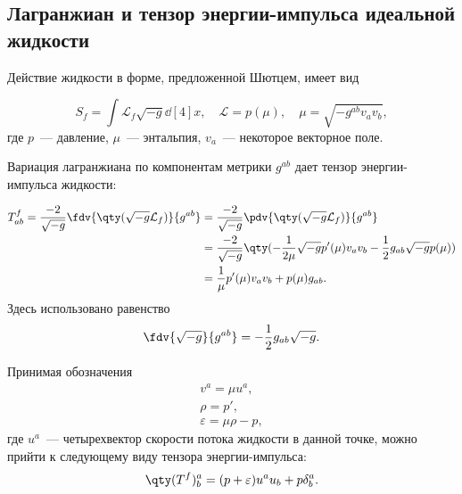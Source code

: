 \documentclass[\docroot/reports/draft/report.tex]{subfiles}
\begin{document}
\onlyinsubfile{\tableofcontents}

\subsection{Лагранжиан и тензор энергии-импульса идеальной жидкости}

    Действие жидкости в форме, предложенной Шютцем, имеет вид

    \begin{equation}
        S_f = \int \mathcal{L}_f \sqrt{-g} \dd[4]{x} , \quad
        \mathcal{L} = p(\mu) , \quad
        \mu = \sqrt{-g^{ab} v_a v_b} ,
    \end{equation}
    где $p$~--- давление, $\mu$~--- энтальпия, $v_a$~--- некоторое векторное поле.

    Вариация лагранжиана по компонентам метрики $g^{ab}$ дает тензор энергии-импульса жидкости:

    \begin{equation}\begin{aligned}
        T^f_{ab} = \frac{-2}{\sqrt{-g}} \fdv{\qty(\sqrt{-g} \mathcal{L}_f)}{g^{ab}} &=
            \frac{-2}{\sqrt{-g}} \pdv{\qty(\sqrt{-g} \mathcal{L}_f)}{g^{ab}} \\ &=
            \frac{-2}{\sqrt{-g}} \qty(
                - \frac{1}{2 \mu} \sqrt{-g} p'(\mu) v_a v_b - \frac{1}{2} g_{ab} \sqrt{-g} p(\mu)
            ) \\ &=
            \frac{1}{\mu} p'(\mu) v_a v_b + p(\mu) g_{ab} .
    \end{aligned}\end{equation}
    Здесь использовано равенство
    \begin{equation*}
        \fdv{\sqrt{-g}}{g^{ab}} = - \frac{1}{2} g_{ab} \sqrt{-g} .
    \end{equation*}

    Принимая обозначения
    \begin{equation*}\begin{gathered}
        v^a = \mu u^a , \\
        \rho = p' , \\
        \varepsilon = \mu \rho - p ,
    \end{gathered}\end{equation*}
    где $u^a$~--- четырехвектор скорости потока жидкости в данной точке, можно прийти к следующему виду тензора энергии-импульса:
    \begin{equation}
        \qty(T^f)^a_b = (p + \varepsilon) u^a u_b + p \delta^a_b .
    \end{equation}
\end{document}
